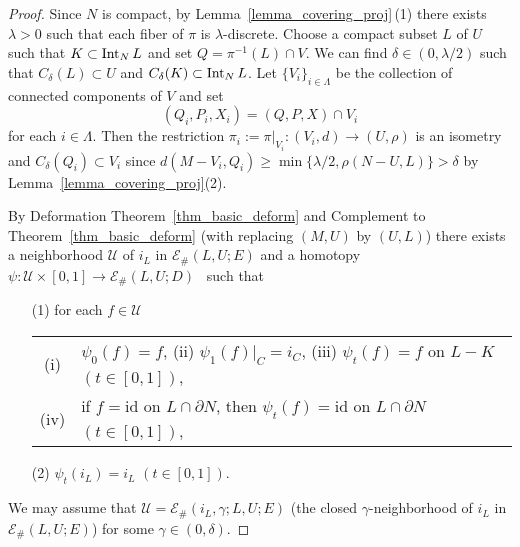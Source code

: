 \documentclass[11pt, fleqn]{amsart}
\theoremstyle{definition}
\newcommand{\cal}{\mathcal}
\newcommand{\lra}{\longrightarrow}
\newcommand{\id}{\mathrm{id}}
\newcommand{\E}{\mathcal E}
\newcommand{\U}{\mathcal U}
\begin{document}
\begin{proof} 
Since $N$ is compact, by Lemma~\ref{lemma_covering_proj}\,(1) there exists $\lambda > 0$ such that each fiber of $\pi$ is $\lambda$-discrete. 
Choose a compact subset $L$ of $U$ such that $K \subset {\rm Int}_N\, L$ and set $Q = \pi^{-1}(L) \cap V$. 
We can find $\delta \in (0, \lambda/2)$ such that $C_{\delta}(L) \subset U$ and $C_{\delta}(K) \subset {\rm Int}_N\, L$.
Let $\{ V_i \}_{i \in \Lambda}$ be the collection of connected components of $V$   
and set 
$$(Q_i, P_i, X_i) = (Q, P, X) \cap V_i$$ 
for each $i \in \Lambda$. 
Then the restriction $\pi_i := \pi|_{V_i} : (V_i, d) \to (U, \rho)$ is an isometry 
and $C_{\delta}(Q_i) \subset V_i$ since 
$d(M - V_i, Q_i) \geq \min \{ \lambda/2, \rho(N - U, L) \} > \delta$ by Lemma~\ref{lemma_covering_proj}(2).

By Deformation Theorem~\ref{thm_basic_deform} and Complement to Theorem~\ref{thm_basic_deform} (with replacing $(M, U)$ by $(U, L)$) 
there exists a neighborhood $\U$ of $i_L$ in ${\mathcal E}_\#(L, U; E)$ 
and a homotopy 
$\psi : \U \times [0, 1] \lra {\mathcal E}_\#(L, U; D)$ \  such that 
\begin{itemize}
\item[{\rm (1)}] for each $f \in {\cal U}$ \ 
\begin{tabular}[t]{c@{\ \,}l}
{\rm (i)} & $\psi_0(f) = f$, \hspace{3mm} {\rm (ii)} 
$\psi_1(f)|_C = i_C$, \hspace{3mm} {\rm (iii)} 
$\psi_t(f) = f$ on $L - K$ $(t \in [0,1])$, \\[2mm] 
{\rm (iv)} & if $f = \id$ on $L \cap \partial N$, then $\psi_t(f) = \id$ on $L \cap \partial N$ $(t \in [0,1])$, 
\end{tabular}
\vskip 1.5mm 
\item[{\rm (2)}] $\psi_t(i_L) = i_L$ $(t \in [0,1])$. 
\end{itemize}
We may assume that ${\cal U} = {\mathcal E}_\#(i_L, \gamma; L, U; E)$ (the closed $\gamma$-neighborhood of $i_L$ in $\E_\#(L, U; E)$) for some $\gamma \in (0, \delta)$. 
  

\end{proof}
\end{document}

